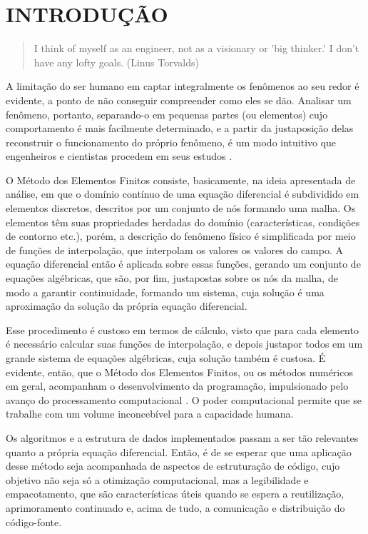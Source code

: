 

\chapter{INTRODUÇÃO}

\begin{quote}
    I think of myself as an engineer, not as a visionary or 'big thinker.' I don't have any lofty goals.
    (Linus Torvalds)  
\end{quote}

A limitação do ser humano em captar integralmente os fenômenos ao seu redor é evidente, a ponto de não conseguir compreender como eles se dão. Analisar um fenômeno, portanto, separando-o em pequenas partes (ou elementos) cujo comportamento é mais facilmente determinado, e a partir da justaposição delas reconstruir o funcionamento do próprio fenômeno, é um modo intuitivo que engenheiros e cientistas procedem em seus estudos \cite[p. 2]{Zin}. 

O Método dos Elementos Finitos consiste, basicamente, na ideia apresentada de análise, em que o domínio contínuo de uma equação diferencial é subdividido em elementos discretos, descritos por um conjunto de nós formando uma malha. Os elementos têm suas propriedades herdadas do domínio (características, condições de contorno etc.), porém, a descrição do fenômeno físico é simplificada por meio de funções de interpolação, que interpolam os valores os valores do campo. A equação diferencial então é aplicada sobre essas funções, gerando um conjunto de equações algébricas, que são, por fim, justapostas sobre os nós da malha, de modo a garantir continuidade, formando um sistema, cuja solução é uma aproximação da solução da própria equação diferencial. \cite[pág. 1 e 2]{LIU}

Esse procedimento é custoso em termos de cálculo, visto que para cada elemento é necessário calcular suas funções de interpolação, e depois justapor todos em um grande sistema de equações algébricas, cuja solução também é custosa. É evidente, então, que o Método dos Elementos Finitos, ou os métodos numéricos em geral, acompanham o desenvolvimento da programação, impulsionado pelo avanço do processamento computacional \cite[pág. 2]{Onate}. O poder computacional permite que se trabalhe com um volume inconcebível para a capacidade humana. 

Os algoritmos e a estrutura de dados implementados passam a ser tão relevantes quanto a própria equação diferencial. Então, é de se esperar que uma aplicação desse método seja acompanhada de aspectos de estruturação de código, cujo objetivo não seja só a otimização computacional, mas a legibilidade e empacotamento, que são características úteis quando se espera a reutilização, aprimoramento continuado e, acima de tudo, a comunicação e distribuição do código-fonte.

